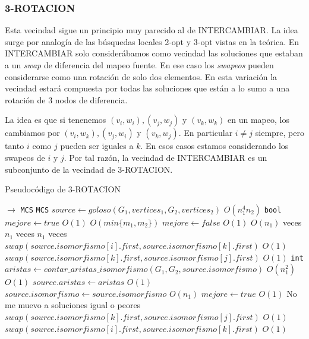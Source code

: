 \subsubsection{3-ROTACION}
Esta vecindad sigue un principio muy parecido al de INTERCAMBIAR. La idea surge por analogía de las búsquedas locales 2-opt y 3-opt vistas en la teórica. En INTERCAMBIAR solo considerábamos como vecindad las soluciones que estaban a un \emph{swap} de diferencia del mapeo fuente. En ese caso los \emph{swapeos} pueden considerarse como una rotación de solo dos elementos. En esta variación la vecindad estará compuesta por todas las soluciones que están a lo sumo a una rotación de 3 nodos de diferencia.

La idea es que si tenenemos $(v_i, w_i), (v_j, w_j)$ y $(v_k, w_k)$ en un mapeo, los cambiamos por $(v_i, w_k), (v_j, w_i)$ y $(v_k, w_j)$. En particular $i \neq j$ siempre, pero tanto $i$ como $j$ pueden ser iguales a $k$. En esos casos estamos considerando los swapeos de $i$ y $j$. Por tal razón, la vecindad de INTERCAMBIAR es un subconjunto de la vecindad de 3-ROTACION.
 
\begin{algorithm}[H]
  \small
  \begin{algorithmic}[1]
  \caption{Pseudocódigo de 3-ROTACION}
  \label{algo:5-3}
    $\rightarrow$ \texttt{MCS}
      \State \texttt{MCS} $source \gets goloso(G_1, vertices_1, G_2, vertices_2)$
      \Comment $O(n_1^4n_2)$
      \State \texttt{bool} $mejore \gets true$
      \Comment $O(1)$
      \Comment $O(min\{m_1, m_2\})$
        \State $mejore \gets false$
        \Comment $O(1)$
        \Comment $O(n_1)$ veces
          \Comment $n_1$ veces
            \Comment $n_1$ veces
              \State $swap(source.isomorfismo[i].first, source.isomorfismo[k].first)$
              \Comment $O(1)$
              \State $swap(source.isomorfismo[k].first, source.isomorfismo[j].first)$
              \Comment $O(1)$
              \State \texttt{int} $aristas \gets contar\_aristas\_isomorfismo(G_1, G_2, source.isomorfismo)$
              \Comment $O(n_1^2)$
              \Comment $O(1)$
                \State $source.aristas \gets aristas$ 
                \Comment $O(1)$             
                \State $source.isomorfismo \gets source.isomorfismo$
                \Comment $O(n_1)$
                \State $mejore \gets true$
                \Comment $O(1)$
              \Else
              \Comment No me muevo a soluciones igual o peores
                \State $swap(source.isomorfismo[k].first, source.isomorfismo[j].first)$
                \Comment $O(1)$
                \State $swap(source.isomorfismo[i].first, source.isomorfismo[k].first)$
                \Comment $O(1)$
              \EndIf
            \EndFor
          \EndFor
        \EndFor
      \EndWhile
    \EndProcedure
  \end{algorithmic}
\end{algorithm}


